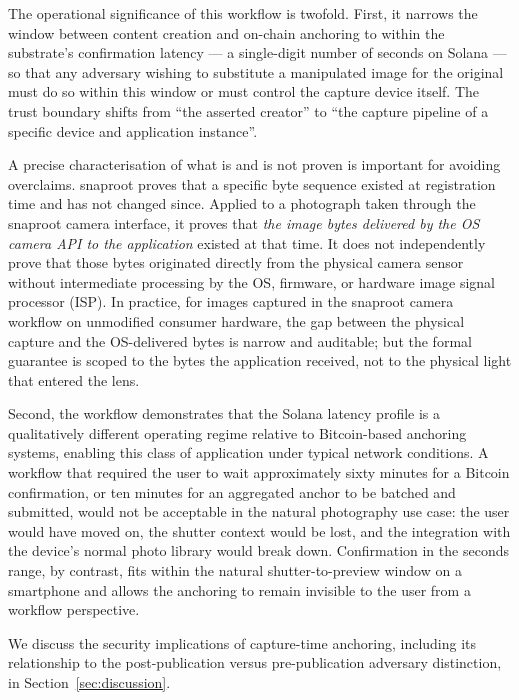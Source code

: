 \documentclass[11pt,a4paper]{article}
\begin{document}
The operational significance of this workflow is twofold. First, it
narrows the window between content creation and on-chain anchoring to
within the substrate's confirmation latency --- a single-digit number
of seconds on Solana --- so that any adversary wishing to substitute a
manipulated image for the original must do so within this window or
must control the capture device itself. The trust boundary shifts from
``the asserted creator'' to ``the capture pipeline of a specific
device and application instance''.

A precise characterisation of what is and is not proven is important
for avoiding overclaims. snaproot proves that a specific byte sequence
existed at registration time and has not changed since. Applied to a
photograph taken through the snaproot camera interface, it proves
that \emph{the image bytes delivered by the OS camera API to the
application} existed at that time. It does not independently prove
that those bytes originated directly from the physical camera sensor
without intermediate processing by the OS, firmware, or hardware
image signal processor (ISP). In practice, for images captured in the
snaproot camera workflow on unmodified consumer hardware, the gap
between the physical capture and the OS-delivered bytes is narrow and
auditable; but the formal guarantee is scoped to the bytes the
application received, not to the physical light that entered the
lens.

Second, the workflow demonstrates that the Solana latency profile is
a qualitatively different operating regime relative to Bitcoin-based
anchoring systems, enabling this class of application under typical
network conditions. A workflow that required the user to wait approximately
sixty minutes for a Bitcoin confirmation, or ten minutes for an
aggregated anchor to be batched and submitted, would not be acceptable
in the natural photography use case: the user would have moved on, the
shutter context would be lost, and the integration with the device's
normal photo library would break down. Confirmation in the seconds
range, by contrast, fits within the natural shutter-to-preview window
on a smartphone and allows the anchoring to remain invisible to the
user from a workflow perspective.

We discuss the security implications of capture-time anchoring,
including its relationship to the post-publication versus
pre-publication adversary distinction, in Section~\ref{sec:discussion}.

\end{document}
